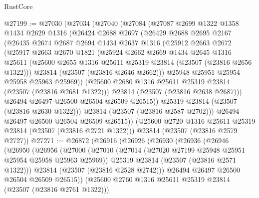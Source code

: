 \begin{lexlean}{RustCore}
\begin{coremodule}
@27199 := @27030
    (@27034
      (@27040
        (@27084
          (@27087
            @2699
            @1322
            @1358
            @1434
            @2629
            @1316
            (@26424
              @2688
              @2697
              (@26429
                @2688
                @2695
                @2167
                (@26435
                  @2674
                  @2687
                  @2694
                  @1434
                  @2637
                  @1316
                  (@25912
                    @2663
                    @2672
                    (@25917
                      @2663
                      @2670
                      @1821
                      (@25924
                        @2662
                        @2669
                        @1434
                        @2645
                        @1316
                        @25611
                        (@25600 @2655 @1316 @25611 @25319 @23814 (@23507 (@23816 @2656 @1322)))
                        @23814
                        (@23507 (@23816 @2646 @2662)))
                      @25948
                      @25951
                      @25954
                      @25958
                      @25963
                      @25969))
                  (@25600 @2680 @1316 @25611 @25319 @23814 (@23507 (@23816 @2681 @1322)))
                  @23814
                  (@23507 (@23816 @2638 @2687)))
                @26494
                @26497
                @26500
                @26504
                @26509
                @26515))
            @25319
            @23814
            (@23507 (@23816 @2630 @1322)))
          @23814
          (@23507 (@23816 @2587 @2702)))
        @26494
        @26497
        @26500
        @26504
        @26509
        @26515))
    (@25600 @2720 @1316 @25611 @25319 @23814 (@23507 (@23816 @2721 @1322)))
    @23814
    (@23507 (@23816 @2579 @2727))
@27271 := @26872
    (@26916
      (@26926
        (@26930
          (@26936
            (@26946
              (@26950
                (@26956
                  (@27000
                    (@27010
                      (@27014 (@27020 @27199 @25948 @25951 @25954 @25958 @25963 @25969))
                      @25319
                      @23814
                      (@23507 (@23816 @2571 @1322)))
                    @23814
                    (@23507 (@23816 @2528 @2742)))
                  @26494
                  @26497
                  @26500
                  @26504
                  @26509
                  @26515))
              (@25600 @2760 @1316 @25611 @25319 @23814 (@23507 (@23816 @2761 @1322)))

\end{coremodule}
\end{lexlean}
